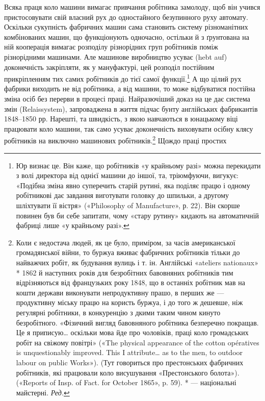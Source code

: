 Всяка праця коло машини вимагає привчання робітника
замолоду, щоб він учився пристосовувати свій власний рух до
одностайного безупинного руху автомату. Оскільки сукупність
фабричних машин сама становить систему різноманітних комбінованих
машин, що функціонують одночасно, остільки й з ґрунтована
на ній кооперація вимагає розподілу різнорідних груп
робітників поміж різнорідними машинами. Але машинове виробництво
усуває (hebt auf) доконечність закріпляти, як у мануфактурі,
цей розподіл постійним прикріпленням тих самих робітників
до тієї самої функції.\footnote{
Юр визнає це. Він каже, що робітників «у крайньому разі» можна
перекидати з волі директора від однієї машини до іншої, та, тріюмфуючи,
вигукує: «Подібна зміна явно суперечить старій рутині, яка поділяє
працю і одному робітникові дає завдання виготувати головку до шпильки,
а другому шліхтувати її вістря» («Philosophy of Manufacture», р. 22).
Він скорше повинен був би себе запитати, чому «стару рутину» кидають
на автоматичній фабриці лише «у крайньому разі».
} А що цілий рух фабрики виходить не від
робітника, а від машини, то може відбуватися постійна зміна
осіб без перерви в процесі праці. Найразючіший доказ на це дає
система змін (Relaissystem), запроваджена в життя підчас бунту
англійських фабрикантів 1848--1850 рр. Нарешті, та швидкість,
з якою навчаються в юнацькому віці працювати коло машини,
так само усуває доконечність виховувати осібну клясу робітників
на виключно машинових робітників.\footnote{
Коли є недостача людей, як це було, приміром, за часів американської
громадянської війни, то буржуа вживає фабричних робітників
тільки до найважчих робіт, як будування вулиць і т. ін. Англійські
«ateliers nationaux» * 1862 й наступних років для безробітних бавовняних
робітників тим відрізняються від французьких року 1848, що в останніх
робітник мав на кошти держави виконувати непродуктивну прашо, в
перших же — продуктивну міську працю на користь буржуа, і до того ж
дешевше, ніж регулярні робітники, в конкуренцію з дкими таким чином
кинуто безробітного. «Фізичний вигляд бавовняного робітника безперечно
покращав. Це я приписую\dots{} оскільки мова йде про чоловіків, праці
коло громадських робіт на свіжому повітрі» («The physical appearance
of the cotton opératives is unquestionably improved. This I attribute\dots{}
as to the men, to outdoor labour on public Works»). (Тут говориться
про престонських фабричних робітників, які працювали коло висушування
«Престонського болота»). («Reports of Insp. of Fact. for October
1865», p. 59).
* — національні майстерні. \emph{Ред.}
} Щождо праці простих
\parbreak{}  %
